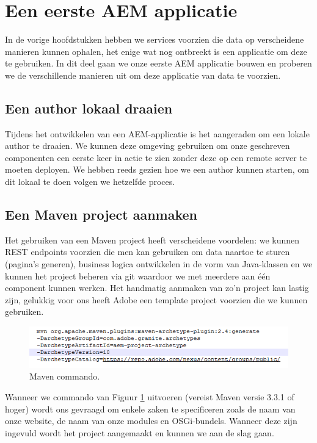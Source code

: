 
	\section{Een eerste AEM applicatie}
	In de vorige hoofdstukken hebben we services voorzien die data op verscheidene manieren kunnen ophalen, het enige wat nog ontbreekt is een applicatie om deze te gebruiken. In dit deel gaan we onze eerste AEM applicatie bouwen en proberen we de verschillende manieren uit om deze applicatie van data te voorzien.
	\subsection{Een author lokaal draaien}
	Tijdens het ontwikkelen van een AEM-applicatie is het aangeraden om een lokale author te draaien. We kunnen deze omgeving gebruiken om onze geschreven componenten een eerste keer in actie te zien zonder deze op een remote server te moeten deployen. We hebben reeds gezien hoe we een author kunnen starten, om dit lokaal te doen volgen we hetzelfde proces.
	\subsection{Een Maven project aanmaken}
		Het gebruiken van een Maven project heeft verscheidene voordelen: we kunnen REST endpoints voorzien die men kan gebruiken om data naartoe te sturen (pagina's generen), business logica ontwikkelen in de vorm van Java-klassen en we kunnen het project beheren via git waardoor we met meerdere aan één component kunnen werken. Het handmatig aanmaken van zo'n project kan lastig zijn, gelukkig voor ons heeft Adobe een template project voorzien die we kunnen gebruiken.
		
	\begin{figure}[h!]
  		\includegraphics[width=\linewidth]{images/maven-archetype.PNG}
  		\caption{Maven commando.}
  		\label{fig:maven-archetype}
	\end{figure}

Wanneer we commando van Figuur \ref{fig:maven-archetype} uitvoeren (vereist Maven versie 3.3.1 of hoger) wordt ons gevraagd om enkele zaken te specificeren zoals de naam van onze website, de naam van onze modules en OSGi-bundels. Wanneer deze zijn ingevuld wordt het project aangemaakt en kunnen we aan de slag gaan.
